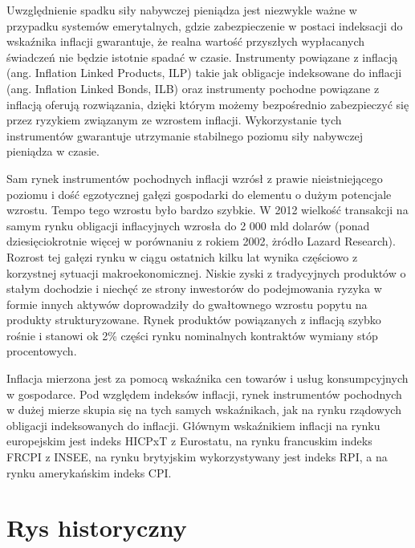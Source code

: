 \documentclass{mini}
\theoremstyle{mythstyle}
\begin{document}
	Uwzględnienie spadku siły nabywczej pieniądza jest niezwykle ważne w przypadku systemów emerytalnych, gdzie zabezpieczenie w postaci indeksacji do wskaźnika inflacji gwarantuje, że realna wartość przyszłych wypłacanych świadczeń nie będzie istotnie spadać w czasie. Instrumenty powiązane z inflacją (ang. Inflation Linked Products, ILP) takie jak obligacje indeksowane do inflacji (ang. Inflation Linked Bonds, ILB) oraz instrumenty pochodne powiązane z inflacją oferują rozwiązania, dzięki którym możemy bezpośrednio zabezpieczyć się przez ryzykiem związanym ze wzrostem inflacji. Wykorzystanie tych instrumentów gwarantuje utrzymanie stabilnego poziomu siły nabywczej pieniądza w czasie.
		
	Sam rynek instrumentów pochodnych inflacji wzrósł z prawie nieistniejącego poziomu i dość egzotycznej gałęzi gospodarki do elementu o dużym potencjale wzrostu. Tempo tego wzrostu było bardzo szybkie. W 2012 wielkość transakcji na samym rynku obligacji inflacyjnych wzrosła do 2 000 mld dolarów (ponad dziesięciokrotnie więcej w porównaniu z rokiem 2002, żródło Lazard Research). Rozrost tej gałęzi rynku w ciągu ostatnich kilku lat wynika częściowo z korzystnej sytuacji makroekonomicznej. Niskie zyski z tradycyjnych produktów o stałym dochodzie i niechęć ze strony inwestorów do podejmowania ryzyka w formie innych aktywów doprowadziły do gwałtownego wzrostu popytu na produkty strukturyzowane. Rynek produktów powiązanych z inflacją szybko rośnie i stanowi ok 2\% części rynku nominalnych kontraktów wymiany stóp procentowych. 
		
	Inflacja mierzona jest za pomocą wskaźnika cen towarów i usług konsumpcyjnych w gospodarce. Pod względem indeksów inflacji, rynek instrumentów pochodnych w dużej mierze skupia się na tych samych wskaźnikach, jak na rynku rządowych obligacji indeksowanych do inflacji. Głównym wskaźnikiem inflacji na rynku europejskim jest indeks HICPxT z Eurostatu, na rynku francuskim  indeks FRCPI z INSEE, na rynku brytyjskim wykorzystywany jest indeks RPI, a na rynku amerykańskim indeks CPI.
		
	\section{Rys historyczny}
		
\end{document}
